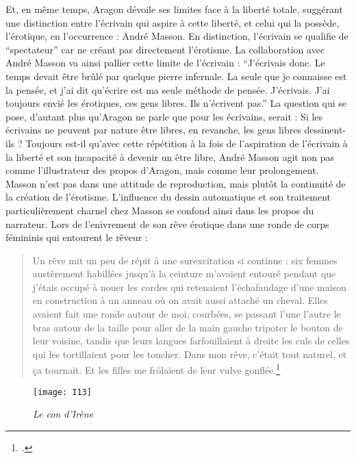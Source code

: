 	Et, en même temps, Aragon dévoile ses limites face à la liberté totale, suggérant une distinction entre l’écrivain qui aspire à cette liberté, et celui qui la possède, l’érotique, en l’occurrence : André Masson. En distinction, l’écrivain se qualifie de \enquote{spectateur} car ne créant pas directement l’érotisme. La collaboration avec André Masson va ainsi  pallier cette limite de l’écrivain : \enquote{J'écrivais donc. Le temps devait être brûlé par quelque pierre infernale. La seule que je connaisse est la pensée, et j’ai dit qu’écrire est ma seule méthode de pensée. J’écrivais. J’ai toujours envié les érotiques, ces gens libres. Ils n’écrivent pas.} La question qui se pose, d’autant plus qu’Aragon ne parle que pour les écrivains, serait : Si les écrivains ne peuvent par nature être libres, en revanche,  les gens libres dessinent-ils ? Toujours est-il qu’avec cette répétition à la fois de l’aspiration de l’écrivain à la liberté et son incapacité à devenir un être libre, André Masson agit non pas comme l’illustrateur des propos d’Aragon, mais comme leur prolongement. Masson n’est pas dans une attitude de reproduction, mais plutôt la continuité de la création de l’érotisme. L'influence du dessin automatique et son traitement particulièrement charnel chez Masson se confond ainsi dans les propos du narrateur. Lors de l'enivrement de son rêve érotique dans une ronde de corps fémininis qui entourent le rêveur :

	\begin{quote}
	Un rêve mit un peu de répit à une surexcitation si continue : six femmes austèrement habillées jusqu’à la ceinture m’avaient entouré pendant que j’étais occupé à nouer les cordes qui retenaient l’échafaudage d’une maison en construction à un anneau où on avait aussi attaché un cheval.
	Elles avaient fait une ronde autour de moi, courbées, se passant l’une l’autre le bras autour de la taille pour aller de la main gauche tripoter le bouton de leur voisine, tandis que leurs langues farfouillaient à droite les culs de celles qui les tortillaient pour les toucher. Dans mon rêve, c’était tout naturel, et ça tournait. Et les filles me frôlaient de leur vulve gonflée.\footcite[p260]{defense}	
	\end{quote} 
	
	\begin{figure}[H]
        \centering
        \texttt{[image: I13]}   
        \caption{\emph{Le con d'Irène}}\label{fig:irene1}
	\end{figure}

